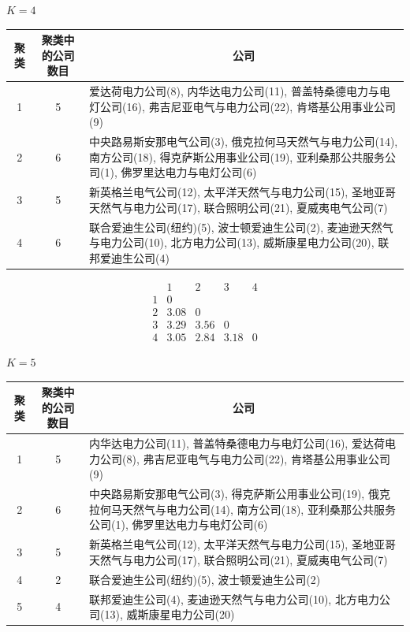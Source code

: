 
\noindent $K=4$

\begin{mvtable}
\footnotesize
\setlength{\tabcolsep}{4pt}%
\begin{tabular}{ccp{9.2cm}}
\toprule
聚类 & 聚类中的公司数目 & \multicolumn{1}{c}{公\quad\quad 司}\\
\midrule
1 & 5 & 爱达荷电力公司(8), 内华达电力公司(11), 普盖特桑德电力与电灯公司(16), 弗吉尼亚电气与电力公司(22), 肯塔基公用事业公司(9)\\
2 & 6 & 中央路易斯安那电气公司(3), 俄克拉何马天然气与电力公司(14), 南方公司(18), 得克萨斯公用事业公司(19), 亚利桑那公共服务公司(1), 佛罗里达电力与电灯公司(6)\\
3 & 5 & 新英格兰电气公司(12), 太平洋天然气与电力公司(15), 圣地亚哥天然气与电力公司(17), 联合照明公司(21), 夏威夷电气公司(7)\\
4 & 6 & 联合爱迪生公司(纽约)(5), 波士顿爱迪生公司(2), 麦迪逊天然气与电力公司(10), 北方电力公司(13), 威斯康星电力公司(20), 联邦爱迪生公司(4)\\
\bottomrule
\end{tabular}
\end{mvtable}

\begin{mvtable}
\[
\begin{array}{ccccc}
 & 1 & 2 & 3 & 4\\
1 & 0 & & & \\
2 & 3.08 & 0 & & \\
3 & 3.29 & 3.56 & 0 & \\
4 & 3.05 & 2.84 & 3.18 & 0
\end{array}
\]
\end{mvtable}

\noindent $K=5$

\begin{mvtable}
\footnotesize
\setlength{\tabcolsep}{4pt}%
\begin{tabular}{ccp{9.2cm}}
\toprule
聚类 & 聚类中的公司数目 & \multicolumn{1}{c}{公\quad\quad 司}\\
\midrule
1 & 5 & 内华达电力公司(11), 普盖特桑德电力与电灯公司(16), 爱达荷电力公司(8), 弗吉尼亚电气与电力公司(22), 肯塔基公用事业公司(9)\\
2 & 6 & 中央路易斯安那电气公司(3), 得克萨斯公用事业公司(19), 俄克拉何马天然气与电力公司(14), 南方公司(18), 亚利桑那公共服务公司(1), 佛罗里达电力与电灯公司(6)\\
3 & 5 & 新英格兰电气公司(12), 太平洋天然气与电力公司(15), 圣地亚哥天然气与电力公司(17), 联合照明公司(21), 夏威夷电气公司(7)\\
4 & 2 & 联合爱迪生公司(纽约)(5), 波士顿爱迪生公司(2)\\
5 & 4 & 联邦爱迪生公司(4), 麦迪逊天然气与电力公司(10), 北方电力公司(13), 威斯康星电力公司(20)\\
\bottomrule
\end{tabular}
\end{mvtable}

